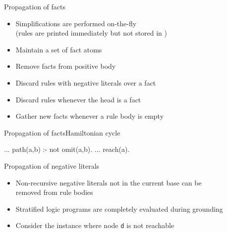\begin{frame}{Propagation of facts}
  \bigskip
  \begin{itemize}
    \item Simplifications are performed \alert{on-the-fly}\\
      (rules are printed immediately but not stored in \gringo)
    \smallskip
    \item Maintain a set of \alert{fact atoms}
    \smallskip
    \item Remove facts from positive body
    \smallskip
    \item Discard rules with negative literals over a fact
    \smallskip
    \item Discard rules whenever the head is a fact
    \smallskip
    \item Gather new facts whenever a rule body is empty
  \end{itemize}
\end{frame}
\begin{frame}[fragile]{Propagation of facts}{Hamiltonian cycle}
  \bigskip
  \begin{SemiVerbatim}{.9}
...
path(a,b) :- not omit(a,b).
...
reach(a). {}
\end{SemiVerbatim}
\end{frame}
\begin{frame}{Propagation of negative literals}
  \bigskip
  \begin{itemize}
  \item \alert{Non-recursive negative literals} not in the current base can be\\ removed from rule bodies
    \smallskip
  \item \alert{Stratified} logic programs are \alert{completely evaluated} during grounding
    \smallskip
  \item Consider the instance where node \texttt{d} is not reachable
  \end{itemize}
  \bigskip
  \begin{center}
    \Graph[draw=none]
  \end{center}
\end{frame}
